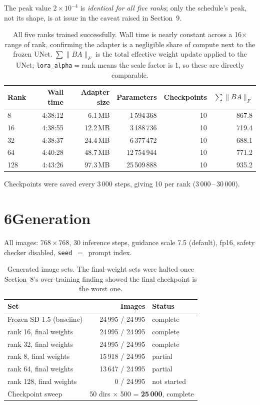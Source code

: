 \documentclass[11pt,a4paper]{article}
\begin{document}
The peak value $2\times10^{-4}$ is \emph{identical for all five ranks}; only the
schedule's peak, not its shape, is at issue in the caveat raised in Section~9.

\begin{table}[h]\centering\small
\begin{tabular}{lrrrrr}
\toprule
Rank & Wall time & Adapter size & Parameters & Checkpoints & $\sum\|BA\|_F$ \\
\midrule
8   & 4:38:12 & 6.1\,MB  & 1\,594\,368  & 10 & 867.8 \\
16  & 4:38:55 & 12.2\,MB & 3\,188\,736  & 10 & 719.4 \\
32  & 4:38:37 & 24.4\,MB & 6\,377\,472  & 10 & 688.1 \\
64  & 4:40:28 & 48.7\,MB & 12\,754\,944 & 10 & 771.2 \\
128 & 4:43:26 & 97.3\,MB & 25\,509\,888 & 10 & 935.2 \\
\bottomrule
\end{tabular}
\caption{All five ranks trained successfully. Wall time is nearly constant
across a 16$\times$ range of rank, confirming the adapter is a negligible share
of compute next to the frozen UNet. $\sum\|BA\|_F$ is the total effective weight
update applied to the UNet; \texttt{lora\_alpha}$=$rank means the scale factor is
1, so these are directly comparable.}
\end{table}

Checkpoints were saved every 3\,000 steps, giving 10 per rank (3\,000\,--\,30\,000).

\section*{6\quad Generation}

All images: $768\times768$, 30 inference steps, guidance scale 7.5 (default),
fp16, safety checker disabled, \texttt{seed}~$=$~prompt index.

\begin{table}[h]\centering\small
\begin{tabular}{lrl}
\toprule
Set & Images & Status \\
\midrule
Frozen SD 1.5 (baseline) & 24\,995 / 24\,995 & complete \\
rank 16, final weights & 24\,995 / 24\,995 & complete \\
rank 32, final weights & 24\,995 / 24\,995 & complete \\
rank 8, final weights & 15\,918 / 24\,995 & partial \\
rank 64, final weights & 13\,647 / 24\,995 & partial \\
rank 128, final weights & 0 / 24\,995 & not started \\
\midrule
Checkpoint sweep & \multicolumn{2}{l}{50 dirs $\times$ 500 = \textbf{25\,000}, complete} \\
\bottomrule
\end{tabular}
\caption{Generated image sets. The final-weight sets were halted once
Section~8's over-training finding showed the final checkpoint is the worst one.}
\end{table}
\end{document}
